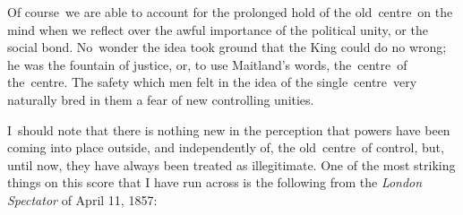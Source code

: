 \documentclass[twoside,symmetric,nobib,justified]{tufte-book}
\begin{document}
Of course~we are able to account for the prolonged hold of the
old~centre~on the mind when we reflect over the awful importance of the
political unity, or the social bond. No~wonder the idea took ground that
the King could do no wrong; he was the fountain of justice, or, to use
Maitland's words, the~centre~of the~centre. The safety which men felt in
the idea of the single~centre~very naturally bred in them a fear of new
controlling unities.~

I~should note that there is nothing new in the perception that powers
have been coming into place outside, and independently of, the
old~centre~of control, but, until now, they have always been treated as
illegitimate. One of the most striking things on this score that I have
run across is the following from the \emph{London Spectator} of April
11, 1857:~
\end{document}
